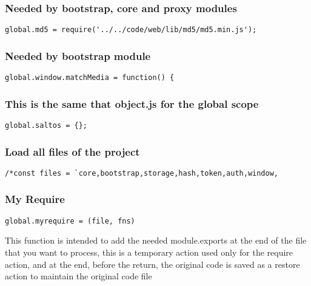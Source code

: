 \documentclass[a4paper]{article}
\begin{document}
\hypertarget{toc6}{}
\subsubsection{Needed by bootstrap, core and proxy modules}

\begin{lstlisting}
global.md5 = require('../../code/web/lib/md5/md5.min.js');
\end{lstlisting}

\hypertarget{toc7}{}
\subsubsection{Needed by bootstrap module}

\begin{lstlisting}
global.window.matchMedia = function() {
\end{lstlisting}

\hypertarget{toc8}{}
\subsubsection{This is the same that object.js for the global scope}

\begin{lstlisting}
global.saltos = {};
\end{lstlisting}

\hypertarget{toc9}{}
\subsubsection{Load all files of the project}

\begin{lstlisting}
/*const files = `core,bootstrap,storage,hash,token,auth,window,
\end{lstlisting}

\hypertarget{toc10}{}
\subsubsection{My Require}

\begin{lstlisting}
global.myrequire = (file, fns)
\end{lstlisting}

This function is intended to add the needed module.exports at the end of the
file that you want to process, this is a temporary action used only for the
require action, and at the end, before the return, the original code is saved
as a restore action to maintain the original code file
\end{document}
